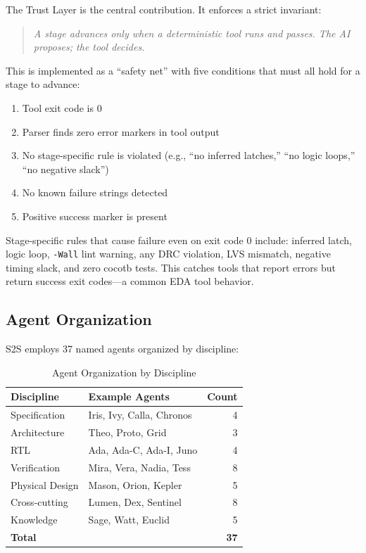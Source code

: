 \documentclass[journal]{IEEEtran}
\begin{document}
The Trust Layer is the central contribution. It enforces a strict invariant:

\begin{quote}
\emph{A stage advances only when a deterministic tool runs and passes. The AI proposes; the tool decides.}
\end{quote}

This is implemented as a ``safety net'' with five conditions that must all hold for a stage to advance:
\begin{enumerate}
    \item Tool exit code is 0
    \item Parser finds zero error markers in tool output
    \item No stage-specific rule is violated (e.g., ``no inferred latches,'' ``no logic loops,'' ``no negative slack'')
    \item No known failure strings detected
    \item Positive success marker is present
\end{enumerate}

Stage-specific rules that cause failure even on exit code 0 include: inferred latch, logic loop, \texttt{-Wall} lint warning, any DRC violation, LVS mismatch, negative timing slack, and zero cocotb tests. This catches tools that report errors but return success exit codes---a common EDA tool behavior.

\subsection{Agent Organization}

S2S employs 37 named agents organized by discipline:

\begin{table}[t]
\centering
\caption{Agent Organization by Discipline}
\label{tab:agents}
\begin{tabular}{@{}llr@{}}
\toprule
\textbf{Discipline} & \textbf{Example Agents} & \textbf{Count} \\
\midrule
Specification & Iris, Ivy, Calla, Chronos & 4 \\
Architecture & Theo, Proto, Grid & 3 \\
RTL & Ada, Ada-C, Ada-I, Juno & 4 \\
Verification & Mira, Vera, Nadia, Tess & 8 \\
Physical Design & Mason, Orion, Kepler & 5 \\
Cross-cutting & Lumen, Dex, Sentinel & 8 \\
Knowledge & Sage, Watt, Euclid & 5 \\
\midrule
\textbf{Total} & & \textbf{37} \\
\bottomrule
\end{tabular}
\end{table}
\end{document}
